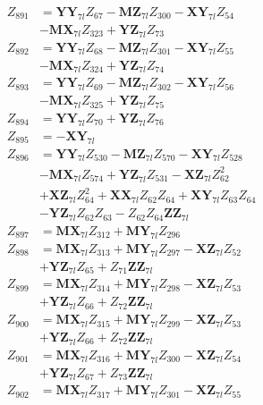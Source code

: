 \begin{multicols}{2}
\begin{align}
Z_{891} &= \mathbf{YY}_{7l}Z_{67} - \mathbf{MZ}_{7l}Z_{300} - \mathbf{XY}_{7l}Z_{54}  \nonumber \\
&- \mathbf{MX}_{7l}Z_{323} + \mathbf{YZ}_{7l}Z_{73} \nonumber \\
Z_{892} &= \mathbf{YY}_{7l}Z_{68} - \mathbf{MZ}_{7l}Z_{301} - \mathbf{XY}_{7l}Z_{55}  \nonumber \\
&- \mathbf{MX}_{7l}Z_{324} + \mathbf{YZ}_{7l}Z_{74} \nonumber \\
Z_{893} &= \mathbf{YY}_{7l}Z_{69} - \mathbf{MZ}_{7l}Z_{302} - \mathbf{XY}_{7l}Z_{56}  \nonumber \\
&- \mathbf{MX}_{7l}Z_{325} + \mathbf{YZ}_{7l}Z_{75} \nonumber \\
Z_{894} &= \mathbf{YY}_{7l}Z_{70} + \mathbf{YZ}_{7l}Z_{76} \nonumber \\
Z_{895} &= -\mathbf{XY}_{7l} \nonumber \\
Z_{896} &= \mathbf{YY}_{7l}Z_{530} - \mathbf{MZ}_{7l}Z_{570} - \mathbf{XY}_{7l}Z_{528}  \nonumber \\
&- \mathbf{MX}_{7l}Z_{574} + \mathbf{YZ}_{7l}Z_{531} - \mathbf{XZ}_{7l}Z_{62}^2  \nonumber \\
&+ \mathbf{XZ}_{7l}Z_{64}^2 + \mathbf{XX}_{7l}Z_{62}Z_{64} + \mathbf{XY}_{7l}Z_{63}Z_{64}  \nonumber \\
&- \mathbf{YZ}_{7l}Z_{62}Z_{63} - Z_{62}Z_{64}\mathbf{ZZ}_{7l} \nonumber \\
Z_{897} &= \mathbf{MX}_{7l}Z_{312} + \mathbf{MY}_{7l}Z_{296} \nonumber \\
Z_{898} &= \mathbf{MX}_{7l}Z_{313} + \mathbf{MY}_{7l}Z_{297} - \mathbf{XZ}_{7l}Z_{52}  \nonumber \\
&+ \mathbf{YZ}_{7l}Z_{65} + Z_{71}\mathbf{ZZ}_{7l} \nonumber \\
Z_{899} &= \mathbf{MX}_{7l}Z_{314} + \mathbf{MY}_{7l}Z_{298} - \mathbf{XZ}_{7l}Z_{53}  \nonumber \\
&+ \mathbf{YZ}_{7l}Z_{66} + Z_{72}\mathbf{ZZ}_{7l} \nonumber \\
Z_{900} &= \mathbf{MX}_{7l}Z_{315} + \mathbf{MY}_{7l}Z_{299} - \mathbf{XZ}_{7l}Z_{53}  \nonumber \\
&+ \mathbf{YZ}_{7l}Z_{66} + Z_{72}\mathbf{ZZ}_{7l} \nonumber \\
Z_{901} &= \mathbf{MX}_{7l}Z_{316} + \mathbf{MY}_{7l}Z_{300} - \mathbf{XZ}_{7l}Z_{54}  \nonumber \\
&+ \mathbf{YZ}_{7l}Z_{67} + Z_{73}\mathbf{ZZ}_{7l} \nonumber \\
Z_{902} &= \mathbf{MX}_{7l}Z_{317} + \mathbf{MY}_{7l}Z_{301} - \mathbf{XZ}_{7l}Z_{55}  \nonumber \\

\end{align}
\end{multicols}
